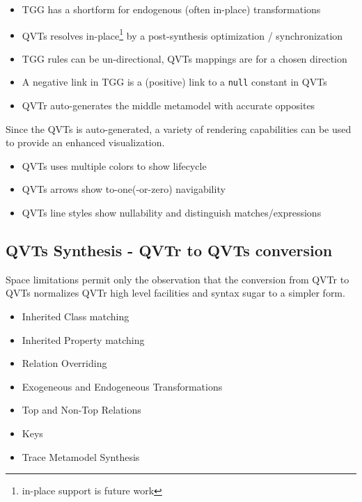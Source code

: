 \documentclass{llncs}
\begin{document}
\begin{itemize}
\item TGG has a shortform for endogenous (often in-place) transformations
\item QVTs resolves in-place\footnote{in-place support is future work} by a post-synthesis optimization / synchronization
\item TGG rules can be un-directional, QVTs mappings are for a chosen direction
\item A negative link in TGG is a (positive) link to a \verb$null$ constant in QVTs
\item QVTr auto-generates the middle metamodel with accurate opposites
\end{itemize}

Since the QVTs is auto-generated, a variety of rendering capabilities can be used to provide an enhanced visualization.

\begin{itemize}
\item QVTs uses multiple colors to show lifecycle
\item QVTs arrows show to-one(-or-zero) navigability
\item QVTs line styles show nullability and distinguish matches/expressions
\end{itemize}

\subsection{QVTs Synthesis - QVTr to QVTs conversion}\label{QVTs Synthesis}

Space limitations permit only the observation that the conversion from QVTr to QVTs normalizes QVTr high level facilities and syntax sugar to a simpler form.

\begin{itemize}
	\item Inherited Class matching
	\item Inherited Property matching
	\item Relation Overriding
	\item Exogeneous and Endogeneous Transformations
	\item Top and Non-Top Relations
	\item Keys
	\item Trace Metamodel Synthesis
\end{itemize}
\end{document}
